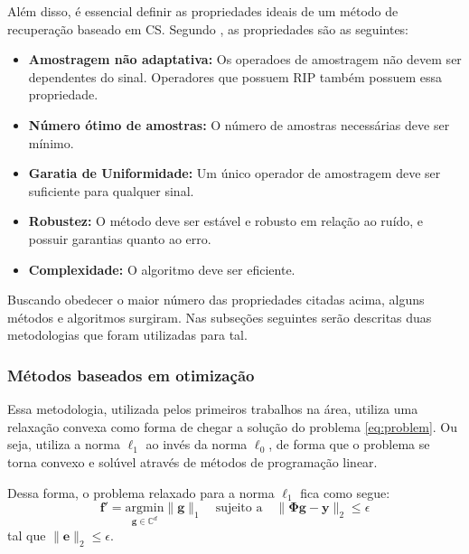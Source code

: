\documentclass[cic,tc]{iiufrgs}
\renewcommand{\vec}[1]{\bm{#1}}
\begin{document}
Além disso, é essencial definir as propriedades ideais de um método de recuperação
baseado em CS. Segundo \citet{chen2015compressed}, as propriedades são as seguintes:
\begin{itemize}
    \item \textbf{Amostragem não adaptativa:} Os operadoes de amostragem não devem ser dependentes do sinal. 
          Operadores que possuem RIP também possuem essa propriedade.
    \item \textbf{Número ótimo de amostras:} O número de amostras necessárias deve ser mínimo.
    \item \textbf{Garatia de Uniformidade:} Um único operador de amostragem deve ser suficiente para qualquer sinal.
    \item \textbf{Robustez:} O método deve ser estável e robusto em relação ao ruído, e possuir garantias 
          quanto ao erro.
    \item \textbf{Complexidade:} O algoritmo deve ser eficiente.
\end{itemize}

Buscando obedecer o maior número das propriedades citadas acima, alguns métodos e algoritmos surgiram. 
Nas subseções seguintes serão descritas duas metodologias que foram utilizadas para tal.

\subsubsection{Métodos baseados em otimização}
Essa metodologia, utilizada pelos primeiros trabalhos na área, utiliza uma relaxação convexa como forma
de chegar a solução do problema \eqref{eq:problem}. Ou seja, utiliza a norma $\ell_1$ ao invés da norma $\ell_0$,
de forma que o problema se torna convexo e solúvel através de métodos de programação linear.

Dessa forma, o problema relaxado para a norma $\ell_1$ fica como segue:
\begin{equation}
    \label{eq:probleml1}
    \vec{f'} = \underset{\vec{g} \in \mathbb{C}^d}{\text{argmin}} \lVert \vec{g} \rVert_1 \hspace{1em} \text{sujeito a} \hspace{1em}
    \lVert \mathbf{\Phi} \vec{g} - \vec{y} \rVert_2 \le \epsilon
\end{equation}
tal que $\lVert \vec{e} \rVert_2 \le \epsilon $.
\end{document}
